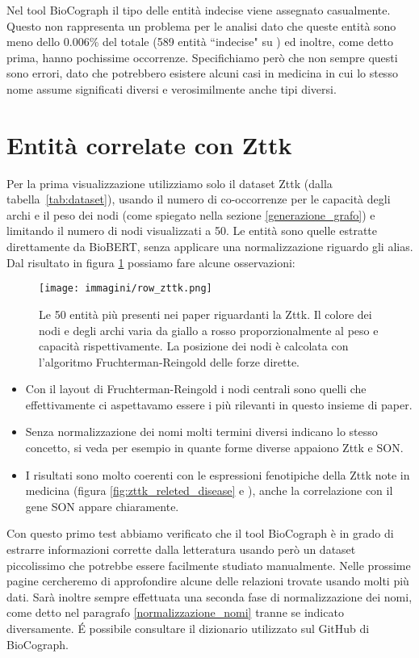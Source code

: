\documentclass[12pt]{report}
\newcommand{\quotes}[1]{``#1"}
\begin{document}
Nel tool BioCograph il tipo delle entità indecise viene assegnato casualmente. Questo non rappresenta un problema per le analisi dato che queste entità sono meno dello 0.006\% del totale (589 entità \quotes{indecise} su ) ed inoltre, come detto prima, hanno pochissime occorrenze. Specifichiamo però che non sempre questi sono errori, dato che potrebbero esistere alcuni casi in medicina in cui lo stesso nome assume significati diversi e verosimilmente anche tipi diversi.


\FloatBarrier
\section{Entità correlate con Zttk}
Per la prima visualizzazione utilizziamo solo il dataset Zttk (dalla tabella~\ref{tab:dataset}), usando il numero di co-occorrenze per le capacità degli archi e il peso dei nodi (come spiegato nella sezione \ref{generazione_grafo}) e limitando il numero di nodi visualizzati a 50. Le entità sono quelle estratte direttamente da BioBERT, senza applicare una normalizzazione riguardo gli alias. Dal risultato in figura \ref{fig:row_zttk} possiamo fare alcune osservazioni:

\begin{figure}[!htb]
\centering
\texttt{[image: immagini/row\_zttk.png]}
\caption{\footnotesize{Le 50 entità più presenti nei paper riguardanti la Zttk. Il colore dei nodi e degli archi varia da giallo a rosso proporzionalmente al peso e capacità rispettivamente. La posizione dei nodi è calcolata con l'algoritmo Fruchterman-Reingold delle forze dirette.}}
\label{fig:row_zttk}
\end{figure}

\begin{itemize}
    \item Con il layout di Fruchterman-Reingold i nodi centrali sono quelli che effettivamente ci aspettavamo essere i più rilevanti in questo insieme di paper.
    \item Senza normalizzazione dei nomi molti termini diversi indicano lo stesso concetto, si veda per esempio in quante forme diverse appaiono Zttk e SON.
    \item I risultati sono molto coerenti con le espressioni fenotipiche della Zttk note in medicina (figura \ref{fig:zttk_releted_disease} e \cite{zttkmalasymtoms}), anche la correlazione con il gene SON appare chiaramente.
\end{itemize}


Con questo primo test abbiamo verificato che il tool BioCograph è in grado di estrarre informazioni corrette dalla letteratura usando però un dataset piccolissimo che potrebbe essere facilmente studiato manualmente. Nelle prossime pagine cercheremo di approfondire alcune delle relazioni trovate usando molti più dati.
Sarà inoltre sempre effettuata una seconda fase di normalizzazione dei nomi, come detto nel paragrafo \ref{normalizzazione_nomi} tranne se indicato diversamente. \'E possibile consultare il dizionario utilizzato sul GitHub di BioCograph.
\end{document}
